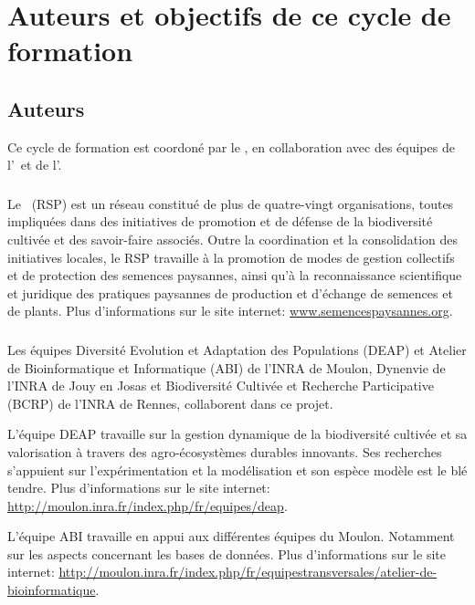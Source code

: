 \section{Auteurs et objectifs de ce cycle de formation}

\subsection{Auteurs}

Ce cycle de formation est coordoné par le \RSP, en collaboration avec des équipes de l'\INRA~et de l'\ITAB.

\subsubsection{\RSP}
Le \RSP~(RSP) est un réseau constitué de plus de quatre-vingt organisations, toutes impliquées dans des initiatives de promotion et de défense de la biodiversité cultivée et des savoir-faire associés.
Outre la coordination et la consolidation des initiatives locales, le RSP travaille à la promotion de modes de gestion collectifs et de protection des semences paysannes, ainsi qu'à la reconnaissance scientifique et juridique des pratiques paysannes de production et d'échange de semences et de plants.
Plus d'informations sur le site internet: \url{www.semencespaysannes.org}.

\subsubsection{\INRA}
Les équipes 
Diversité Evolution et Adaptation des Populations (DEAP) et 
Atelier de Bioinformatique et Informatique (ABI) de l'INRA de Moulon, 
Dynenvie de l'INRA de Jouy en Josas et 
Biodiversité Cultivée et Recherche Participative (BCRP) de l'INRA de Rennes, 
collaborent dans ce projet.

L'équipe DEAP travaille sur la gestion dynamique de la biodiversité cultivée et sa valorisation à travers des agro-écosystèmes durables innovants. 
Ses recherches s'appuient sur l'expérimentation et la modélisation et son espèce modèle est le blé tendre.
Plus d'informations sur le site internet: \url{http://moulon.inra.fr/index.php/fr/equipes/deap}.

L'équipe ABI travaille en appui aux différentes équipes du Moulon. Notamment sur les aspects concernant les bases de données.
Plus d'informations sur le site internet: \url{http://moulon.inra.fr/index.php/fr/equipestransversales/atelier-de-bioinformatique}.

